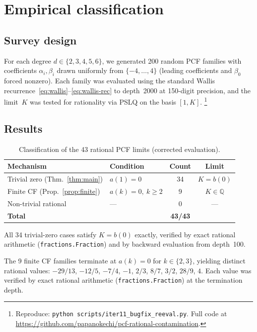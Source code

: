 \documentclass[11pt]{amsart}
\theoremstyle{definition}
\theoremstyle{remark}
\begin{document}
\section{Empirical classification}\label{sec:empirical}

\subsection{Survey design}
For each degree $d\in\{2,3,4,5,6\}$, we generated 200 random PCF families
with coefficients $\alpha_i,\beta_i$ drawn uniformly from $\{-4,\ldots,4\}$
(leading coefficients and $\beta_0$ forced nonzero).
Each family was evaluated using the standard Wallis
recurrence~\eqref{eq:wallis}--\eqref{eq:wallis-rec} to depth~2000
at 150-digit precision, and the limit~$K$ was tested for rationality
via PSLQ on the basis $[1,K]$.%
\footnote{Reproduce:
  \texttt{python scripts/iter11\_bugfix\_reeval.py}.
  Full code at \url{https://github.com/papanokechi/pcf-rational-contamination}.}

\subsection{Results}

\begin{table}[ht]
\centering
\caption{Classification of the 43 rational PCF limits (corrected evaluation).}
\label{tab:classification}
\small
\begin{tabular}{@{}llcc@{}}
\toprule
\textbf{Mechanism} & \textbf{Condition} & \textbf{Count} & \textbf{Limit} \\
\midrule
Trivial zero (Thm.~\ref{thm:main}) & $a(1)=0$ & 34 & $K=b(0)$ \\
Finite CF (Prop.~\ref{prop:finite}) & $a(k)=0,\ k\ge 2$ & 9 & $K\in\mathbb{Q}$ \\
Non-trivial rational & --- & 0 & --- \\
\midrule
\textbf{Total} & & \textbf{43/43} & \\
\bottomrule
\end{tabular}
\end{table}

All 34 trivial-zero cases satisfy $K = b(0)$ exactly, verified by
exact rational arithmetic (\texttt{fractions.Fraction}) and by
backward evaluation from depth~100.

The 9 finite CF families terminate at $a(k)=0$ for $k\in\{2,3\}$,
yielding distinct rational values: $-29/13$, $-12/5$, $-7/4$, $-1$,
$2/3$, $8/7$, $3/2$, $28/9$, $4$.
Each value was verified by exact rational arithmetic
(\texttt{fractions.Fraction}) at the termination depth.
\end{document}
